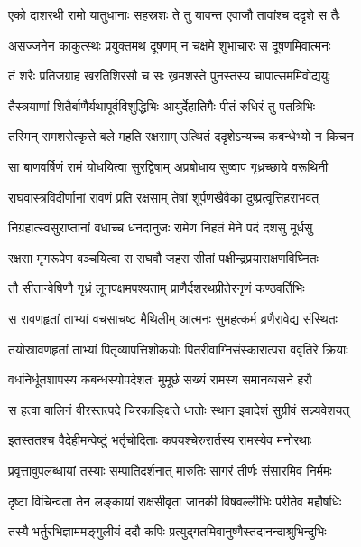 \twolineshloka
{एको दाशरथी रामो यातुधानाः सहस्रशः}
{ते तु यावन्त एवाजौ तावांश्च ददृशे स तैः} %

\twolineshloka
{असज्जनेन काकुत्स्थः प्रयुक्तमथ दूषणम्}
{न चक्षमे शुभाचारः स दूषणमिवात्मनः} %

\twolineshloka
{तं शरैः प्रतिजग्राह खरतिशिरसौ च सः}
{ख्रमशस्ते पुनस्तस्य चापात्सममिवोद्ययुः} %

\twolineshloka
{तैस्त्रयाणां शितैर्बाणैर्यथापूर्वविशुद्धिभिः}
{आयुर्देहातिगैः पीतं रुधिरं तु पतत्रिभिः} %

\twolineshloka
{तस्मिन् रामशरोत्कृत्ते बले महति रक्षसाम्}
{उत्थितं ददृशेऽन्यच्च कबन्धेभ्यो न किचन} %

\twolineshloka
{सा बाणवर्षिणं रामं योधयित्वा सुरद्विषाम्}
{अप्रबोधाय सुष्वाप गृध्रच्छाये वरूथिनी} %

\twolineshloka
{राघवास्त्रविदीर्णानां रावणं प्रति रक्षसाम्}
{तेषां शूर्पणखैवैका दुष्प्रत्वृत्तिहराभवत्} %

\twolineshloka
{निग्रहात्स्वसुराप्तानां वधाच्च धनदानुजः}
{रामेण निहतं मेने पदं दशसु मूर्धसु} %

\twolineshloka
{रक्षसा मृगरूपेण वञ्चयित्वा स राघवौ}
{जहरा सीतां पक्षीन्द्रप्रयासक्षणविघ्नितः} %

\twolineshloka
{तौ सीतान्वेषिणौ गृध्रं लूनपक्षमपश्यताम्}
{प्राणैर्दशरथप्रीतेरनृणं कण्ठवर्तिभिः} %

\twolineshloka
{स रावणहृतां ताभ्यां वचसाचष्ट मैथिलीम्}
{आत्मनः सुमहत्कर्म व्रणैरावेद्य संस्थितः} %

\twolineshloka
{तयोस्रावणहृतां ताभ्यां पितृव्यापत्तिशोकयोः}
{पितरीवाग्निसंस्कारात्परा ववृतिरे क्रियाः} %

\twolineshloka
{वधनिर्धूतशापस्य कबन्धस्योपदेशतः}
{मुमूर्छ सख्यं रामस्य समानव्यसने हरौ} %

\twolineshloka
{स हत्वा वालिनं वीरस्तत्पदे चिरकाङ्क्षिते}
{धातोः स्थान इवादेशं सुग्रीवं सन्न्यवेशयत्} %

\twolineshloka
{इतस्ततश्च वैदेहीमन्वेष्टुं भर्तृचोदिताः}
{कपयश्चेरुरार्तस्य रामस्येव मनोरथाः} %

\twolineshloka
{प्रवृत्तावुपलब्धायां तस्याः सम्पातिदर्शनात्}
{मारुतिः सागरं तीर्णः संसारमिव निर्ममः} %

\twolineshloka
{दृष्टा विचिन्वता तेन लङ्कायां राक्षसीवृता}
{जानकी विषवल्लीभिः परीतेव महौषधिः} %

\twolineshloka
{तस्यै भर्तुरभिज्ञाममङ्गुलीयं ददौ कपिः}
{प्रत्युद्गतमिवानुष्णैस्तदानन्दाश्रुभिन्दुभिः} %

